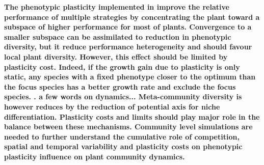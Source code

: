\begin{figure}\label{fig:variable_pl_effect}
    \classiccaptionstyle
{}
\end{figure}


\textbf{The phenotypic plasticity implemented in \model improve the relative performance of multiple strategies by concentrating the plant toward a subspace of higher performance for most of plants. Convergence to a smaller subspace can be assimilated to reduction in phenotypic diversity, but it reduce performance heterogeneity and should favour local plant diversity. However, this effect should be limited by plasticity cost. Indeed, if the growth gain due to plasticity is only static, any species with a fixed phenotype closer to the optimum than the focus species has a better growth rate and exclude the focus species.
. a few words on dynamics... Meta-community diversity is however reduces by the reduction of potential axis for niche differentiation. Plasticity costs and limits should play major role in the balance between these mechanisms. Community level simulations are needed to further understand the cumulative role of competition, spatial and temporal variability and plasticity costs on phenotypic plasticity influence on plant community dynamics.}


